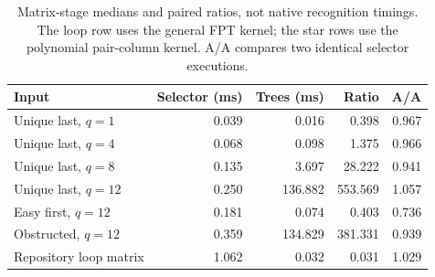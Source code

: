 \begin{table}[htbp]\centering\small
\begin{tabular}{lrrrr}\toprule
Input & Selector (ms) & Trees (ms) & Ratio & A/A\\\midrule
Unique last, $q=1$ & 0.039 & 0.016 & 0.398 & 0.967\\
Unique last, $q=4$ & 0.068 & 0.098 & 1.375 & 0.966\\
Unique last, $q=8$ & 0.135 & 3.697 & 28.222 & 0.941\\
Unique last, $q=12$ & 0.250 & 136.882 & 553.569 & 1.057\\
Easy first, $q=12$ & 0.181 & 0.074 & 0.403 & 0.736\\
Obstructed, $q=12$ & 0.359 & 134.829 & 381.331 & 0.939\\
Repository loop matrix & 1.062 & 0.032 & 0.031 & 1.029\\
\bottomrule\end{tabular}
\caption{Matrix-stage medians and paired ratios, not native recognition timings. The loop row uses the general FPT kernel; the star rows use the polynomial pair-column kernel. A/A compares two identical selector executions.}
\end{table}
